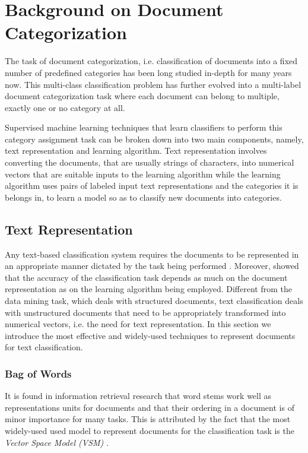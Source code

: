 \chapter{Background on Document Categorization}
\label{chapter:relatedwork}
The task of document categorization, i.e. classification of documents into a fixed number of predefined categories has been long studied in-depth for many years now. This multi-class classification problem has further evolved into a multi-label document categorization task where each document can belong to multiple, exactly one or no category at all. 

Supervised machine learning techniques that learn classifiers to perform this category assignment task can be broken down into two main components, namely, text representation and learning algorithm. 
Text representation involves converting the documents, that are usually strings of characters, into numerical vectors that are suitable inputs to the learning algorithm while the learning algorithm uses pairs of labeled input text representations and the categories it is belongs in, to learn a model so as to classify new documents into categories.

\section{Text Representation}
\label{sec:textrepr}
Any text-based classification system requires the documents to be represented in an appropriate manner dictated by the task being performed \citep{lewis1992text}. Moreover, \citep{quinlan1983learning} showed that the accuracy of the classification task depends as much on the document representation as on the learning algorithm being employed. Different from the data mining task, which deals with structured documents, text classification deals with unstructured documents that need to be appropriately transformed into numerical vectors, i.e. the need for text representation. In this section we introduce the most effective and widely-used techniques to represent documents for text classification.

\subsection{Bag of Words}
It is found in information retrieval research that word stems work well as representations units for documents and that their ordering in a document is of minor importance for many tasks. This is attributed by the fact that the most widely-used used model to represent documents for the classification task is the \emph{Vector Space Model (VSM)} \citep{salton1973specification}. 

